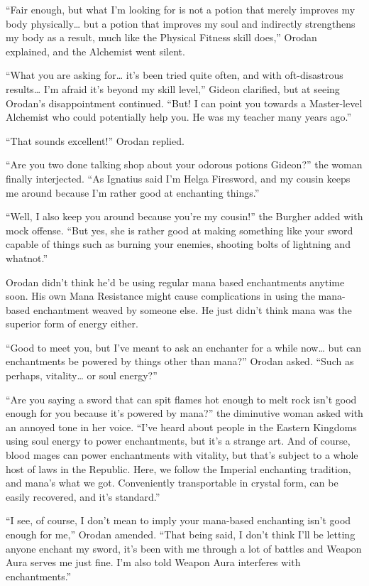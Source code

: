 \documentclass[a4paper,10pt]{book}
\begin{document}
“Fair enough, but what I’m looking for is not a potion that merely improves my body physically… but a potion that improves my soul and indirectly strengthens my body as a result, much like the Physical Fitness skill does,” Orodan explained, and the Alchemist went silent.\par
“What you are asking for… it’s been tried quite often, and with oft-disastrous results… I’m afraid it’s beyond my skill level,” Gideon clarified, but at seeing Orodan’s disappointment continued. “But! I can point you towards a Master-level Alchemist who could potentially help you. He was my teacher many years ago.”\par
“That sounds excellent!” Orodan replied.\par
“Are you two done talking shop about your odorous potions Gideon?” the woman finally interjected. “As Ignatius said I’m Helga Firesword, and my cousin keeps me around because I’m rather good at enchanting things.”\par
“Well, I also keep you around because you’re my cousin!” the Burgher added with mock offense. “But yes, she is rather good at making something like your sword capable of things such as burning your enemies, shooting bolts of lightning and whatnot.”\par
Orodan didn’t think he’d be using regular mana based enchantments anytime soon. His own Mana Resistance might cause complications in using the mana-based enchantment weaved by someone else. He just didn’t think mana was the superior form of energy either.\par
“Good to meet you, but I’ve meant to ask an enchanter for a while now… but can enchantments be powered by things other than mana?” Orodan asked. “Such as perhaps, vitality… or soul energy?”\par
“Are you saying a sword that can spit flames hot enough to melt rock isn’t good enough for you because it’s powered by mana?” the diminutive woman asked with an annoyed tone in her voice. “I’ve heard about people in the Eastern Kingdoms using soul energy to power enchantments, but it’s a strange art. And of course, blood mages can power enchantments with vitality, but that’s subject to a whole host of laws in the Republic. Here, we follow the Imperial enchanting tradition, and mana’s what we got. Conveniently transportable in crystal form, can be easily recovered, and it’s standard.”\par
“I see, of course, I don’t mean to imply your mana-based enchanting isn’t good enough for me,” Orodan amended. “That being said, I don’t think I’ll be letting anyone enchant my sword, it’s been with me through a lot of battles and Weapon Aura serves me just fine. I’m also told Weapon Aura interferes with enchantments.”\par
\end{document}

